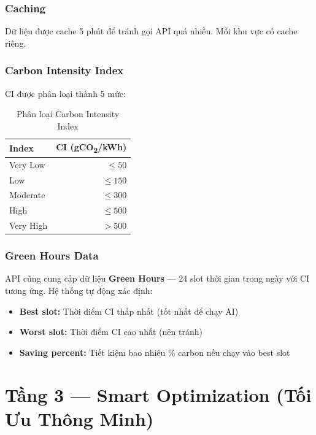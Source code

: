 \documentclass[12pt,a4paper]{article}
\begin{document}
\subsubsection{Caching}

Dữ liệu được cache 5 phút để tránh gọi API quá nhiều. Mỗi khu vực có cache riêng.

\subsubsection{Carbon Intensity Index}

CI được phân loại thành 5 mức:

\begin{table}[h]
    \centering
    \begin{tabular}{lr}
        \toprule
        \textbf{Index} & \textbf{CI (gCO\textsubscript{2}/kWh)} \\
        \midrule
        Very Low  & $\leq 50$ \\
        Low       & $\leq 150$ \\
        Moderate  & $\leq 300$ \\
        High      & $\leq 500$ \\
        Very High & $> 500$ \\
        \bottomrule
    \end{tabular}
    \caption{Phân loại Carbon Intensity Index}
\end{table}

\subsubsection{Green Hours Data}

API cũng cung cấp dữ liệu \textbf{Green Hours} — 24 slot thời gian trong ngày với CI tương ứng. Hệ thống tự động xác định:
\begin{itemize}
    \item \textbf{Best slot:} Thời điểm CI thấp nhất (tốt nhất để chạy AI)
    \item \textbf{Worst slot:} Thời điểm CI cao nhất (nên tránh)
    \item \textbf{Saving percent:} Tiết kiệm bao nhiêu \% carbon nếu chạy vào best slot
\end{itemize}

\section{Tầng 3 — Smart Optimization (Tối Ưu Thông Minh)}
\end{document}
